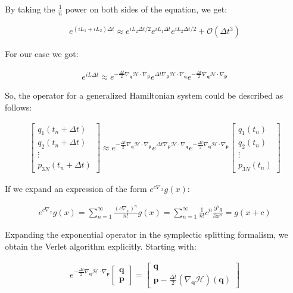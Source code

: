 \documentclass[draft]{agujournal2019}
\begin{document}
\begin{definition}
By taking the $\frac{1}{n}$ power on both sides of the equation, we get:

\begin{align*}
    e^{(iL_1 + iL_2) \Delta t} \approx e^{iL_2 \Delta t / 2} e^{iL_1 \Delta t} e^{iL_2 \Delta t / 2} + \mathcal{O}(\Delta t^3)
\end{align*}

For our case we got:

\begin{align*}
    e^{iL\Delta t} \approx e^{- \frac{\Delta t}{2} \nabla_{\mathbf{q}} \mathcal{H} \cdot \nabla_{\mathbf{p}}}e^{\Delta t\nabla_{\mathbf{p}} \mathcal{H} \cdot \nabla_{\mathbf{q}}}e^{- \frac{\Delta t}{2} \nabla_{\mathbf{q}} \mathcal{H} \cdot \nabla_{\mathbf{p}}}
\end{align*}


So, the operator for a generalized Hamiltonian system could be described as follows:

\begin{align*}
    \begin{bmatrix} q_1(t_n + \Delta t) \\ q_2(t_n + \Delta t) \\ \vdots \\ p_{3N}(t_n + \Delta t)\end{bmatrix} \approx e^{- \frac{\Delta t}{2}\nabla_\mathbf{q} \mathcal{H} \cdot \nabla_\mathbf{p}} e^{\Delta t \nabla_\mathbf{p} \mathcal{H} \cdot \nabla_\mathbf{q}} e^{- \frac{\Delta t}{2}\nabla_\mathbf{q} \mathcal{H} \cdot \nabla_\mathbf{p}}
    \begin{bmatrix} q_1(t_n) \\ q_2(t_n) \\ \vdots \\ p_{3N}(t_n) \end{bmatrix}
\end{align*}

If we expand an expression of the form $e^{c\nabla_{x}} g(x)$:

\begin{align*}
    e^{c\nabla_x} g(x) = \sum_{n = 1}^\infty \frac{\left(c \nabla_x\right)^n}{n!} g(x)= \sum_{n = 1}^\infty \frac{1}{n!} c^n \frac{\partial^n g}{\partial x^n} = g(x + c)
\end{align*}

Expanding the exponential operator in the symplectic splitting formalism, we obtain the Verlet algorithm explicitly. Starting with:

\begin{align*}
    e^{- \frac{\Delta t}{2} \nabla_\mathbf{q} \mathcal{H} \cdot \nabla_\mathbf{p}}
    \begin{bmatrix} \mathbf{q} \\ \mathbf{p} \end{bmatrix} =
    \begin{bmatrix} \mathbf{q} \\ \mathbf{p} - \frac{\Delta t}{2} \left(\nabla_\mathbf{q} \mathcal{H}\right) (\mathbf{q}) \end{bmatrix}
\end{align*}


\end{definition}
\end{document}
